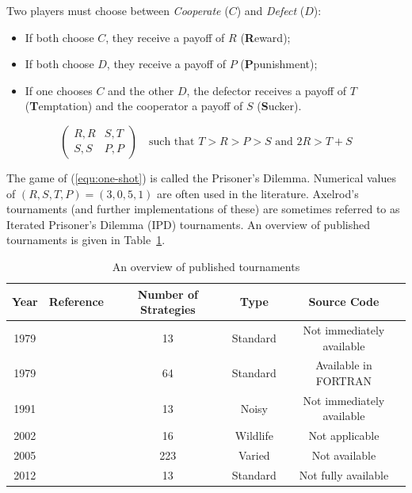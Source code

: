 \documentclass{article}
\begin{document}
Two players must choose between \textit{Cooperate} (\(C\)) and \textit{Defect}
(\(D\)):

\begin{itemize}
    \item If both choose \(C\), they receive a payoff of \(R\)
        (\textbf{R}eward);
    \item If both choose \(D\), they receive a payoff of \(P\)
        (\textbf{P}punishment);
    \item If one chooses \(C\) and the other \(D\), the defector receives a
        payoff of \(T\) (\textbf{T}emptation) and the cooperator a payoff of
        \(S\) (\textbf{S}ucker).
\end{itemize}

\begin{equation}
    \begin{pmatrix}
        R,R & S,T\\
        S,S & P,P
    \end{pmatrix}\quad\text{such that } T>R>P>S \text{ and } 2R > T + S
    \label{equ:one-shot}
\end{equation}

The game of (\ref{equ:one-shot}) is called the Prisoner's Dilemma. Numerical
values of \((R,S,T,P)=(3,0,5,1)\) are often used in the literature. Axelrod's
tournaments (and further implementations of these) are sometimes referred to as
Iterated Prisoner's Dilemma (IPD) tournaments. An overview of published tournaments is
given in Table~\ref{tab:tournaments}.

\begin{table}[!hbtp]
    \begin{center}
        \begin{tabular}{ccccc}
            \toprule
            Year     & Reference           & Number of Strategies & Type     & Source Code\\
            \midrule
            1979     & \cite{Axelrod1980a} & 13                   & Standard & Not immediately available\\
            1979     & \cite{Axelrod1980b} & 64                   & Standard & Available in FORTRAN\\
            1991     & \cite{Bendor1991}   & 13                   & Noisy    & Not immediately available\\
            2002     & \cite{Stephens2002} & 16                   & Wildlife & Not applicable\\
            2005     & \cite{kendall2007iterated} & 223           & Varied   & Not available \\
            2012     & \cite{Stewart2012} & 13                    & Standard & Not fully available \\
            \bottomrule
        \end{tabular}
    \end{center}
    \caption{An overview of published tournaments}\label{tab:tournaments}
\end{table}
\end{document}

